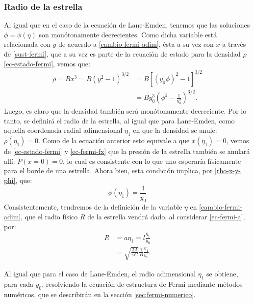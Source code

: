 \subsubsection{Radio de la estrella}
Al igual que en el caso de la ecuación de Lane-Emden, tenemos que las soluciones $\phi=\phi(\eta)$ son monótonamente decrecientes. Como dicha variable está relacionada con $y$  de acuerdo a \eqref{cambio-fermi-adim}, ésta a su vez con $x$ a través de \eqref{sust-fermi}, que a su vez es parte de la ecuación de estado para la densidad $\rho$ \eqref{ec-estado-fermi}, vemos que:
\begin{equation}\label{rho-x-y-phi}
\begin{split}
 \rho=Bx^3=B\left(y^2-1\right)^{3/2}&=B\left[(y_0\phi)^2-1\right]^{3/2}\\
&=By_0^3\left(\phi^2-\frac{1}{y_0^2}\right)^{3/2}.
\end{split}
\end{equation}
Luego, es claro que la densidad también será monótonamente decreciente. Por lo tanto, se definirá el radio de la estrella, al igual que para Lane-Emden, como aquella coordenada radial adimensional $\eta_1$ en que la densidad se anule: $\rho(\eta_1)=0$. Como de la ecuación anterior esto equivale a que $x(\eta_1)=0$, vemos de \eqref{ec-estado-fermi} y \eqref{ec-fermi-fx} que la presión de la estrella también se anulará allí: $P(x=0)=0$, lo cual es consistente con lo que uno esperaría físicamente para el borde de una estrella. Ahora bien, esta condición implica, por \eqref{rho-x-y-phi}, que:
\begin{equation}
\phi(\eta_1)=\frac{1}{y_0}\label{ec-fermi-raices}
\end{equation}
Consistentemente, tendremos de la definición de la variable $\eta$ en \eqref{cambio-fermi-adim}, que el radio físico $R$ de la estrella vendrá dado, al considerar \eqref{ec-fermi-a}, por:
\begin{equation}\label{ec-fermi-radio}
\boxed{
\begin{aligned}
 R&=a\eta_1=l\frac{\eta_1}{y_0}\\
&=\sqrt{\frac{2A}{\pi G}}\frac{1}{B}\frac{\eta_1}{y_0}.
\end{aligned}}
\end{equation}

Al igual que para el caso de Lane-Emden, el radio adimensional $\eta_1$ se obtiene, para cada $y_0$, resolviendo la ecuación de estructura de Fermi mediante métodos numéricos, que se describirán en la sección \ref{sec:fermi-numerico}.

